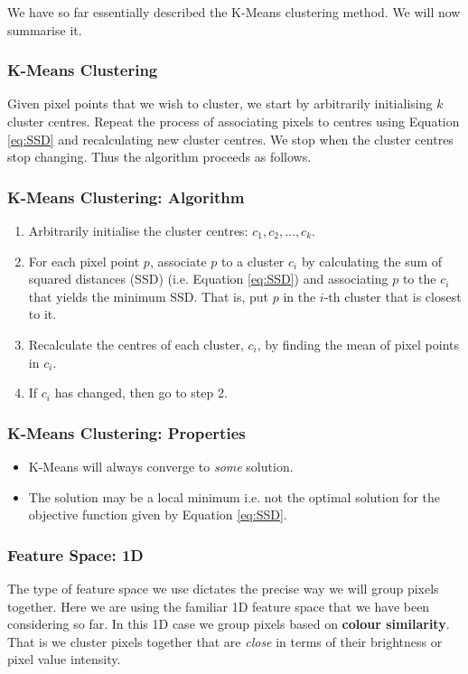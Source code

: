 \documentclass{article}
\begin{document}
We have so far essentially described the K-Means clustering method. We will now summarise it.

\subsubsection{K-Means Clustering}
Given pixel points that we wish to cluster, we start by arbitrarily initialising $k$ cluster centres. Repeat the process of associating pixels to centres using Equation \ref{eq:SSD} and recalculating new cluster centres. We stop when the cluster centres stop changing. Thus the algorithm proceeds as follows.

\subsubsection*{K-Means Clustering: Algorithm}
\begin{enumerate}
\item Arbitrarily initialise the cluster centres: $c_1, c_2, ..., c_k$.
\item For each pixel point $p$, associate $p$ to a cluster $c_i$ by calculating the sum of squared distances (SSD) (i.e. Equation \ref{eq:SSD}) and associating $p$ to the $c_i$ that yields the minimum SSD. That is, put $p$ in the $i$-th cluster that is closest to it.
\item Recalculate the centres of each cluster, $c_i$, by finding the mean of pixel  points in $c_i$.
\item If $c_i$ has changed, then go to step 2.
\end{enumerate}

\subsubsection*{K-Means Clustering: Properties}
\begin{itemize}
\item K-Means will always converge to \textit{some} solution.
\item The solution may be a local minimum i.e. not the optimal solution for the objective function given by Equation \ref{eq:SSD}.
\end{itemize}

\subsubsection{Feature Space: 1D}
The type of feature space we use dictates the precise way we will group pixels together. Here we are using the familiar 1D feature space that we have been considering so far. In this 1D case we group pixels based on \textbf{colour similarity}. That is we cluster pixels together that are \textit{close} in terms of their brightness or pixel value intensity.
\end{document}

